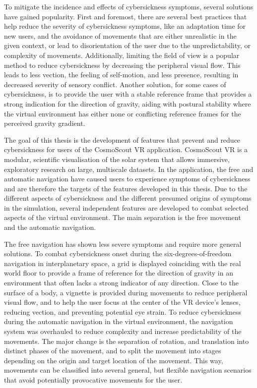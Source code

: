 To mitigate the incidence and effects of cybersickness symptoms, several solutions have gained popularity.
First and foremost, there are several best practices that help reduce the severity of cybersickness symptoms, like an
adaptation time for new users, and the avoidance of movements that are either unrealistic in the given context, or
lead to disorientation of the user due to the unpredictability, or complexity of movements.
Additionally, limiting the field of view is a popular method to reduce cybersickness by decreasing the peripheral
visual flow.
This leads to less vection, the feeling of self-motion, and less presence, resulting in decreased severity of sensory
conflict.
Another solution, for some cases of cybersickness, is to provide the user with a stable reference frame that provides a
strong indication for the direction of gravity, aiding with postural stability where the virtual environment has
either none or conflicting reference frames for the perceived gravity gradient.

The goal of this thesis is the development of features that prevent and reduce cybersickness for users of the
CosmoScout VR application.
CosmoScout VR is a modular, scientific visualisation of the solar system that allows immersive, exploratory research
on large, multiscale datasets.
In the application, the free and automatic navigation have caused users to experience symptoms of cybersickness and
are therefore the targets of the features developed in this thesis.
Due to the different aspects of cybersickness and the different presumed origins of symptoms in the simulation,
several independent features are developed to combat selected aspects of the virtual environment.
The main separation is the free movement and the automatic navigation.

The free navigation has shown less severe symptoms and require more general solutions.
To combat cybersickness onset during the six-degrees-of-freedom navigation in interplanetary space, a grid is
displayed coinciding with the real world floor to provide a frame of reference for the direction of gravity in an
environment that often lacks a strong indicator of any direction.
Close to the surface of a body, a vignette is provided during movements to reduce peripheral visual flow, and to help
the user focus at the center of the VR device's lenses, reducing vection, and preventing potential eye strain.
To reduce cybersickness during the automatic navigation in the virtual environment, the navigation system was
overhauled to reduce complexity and increase predictability of the movements.
The major change is the separation of rotation, and translation into distinct phases of the movement, and to split the
movement into stages depending on the origin and target location of the movement.
This way, movements can be classified into several general, but flexible navigation scenarios that avoid potentially
provocative movements for the user.

